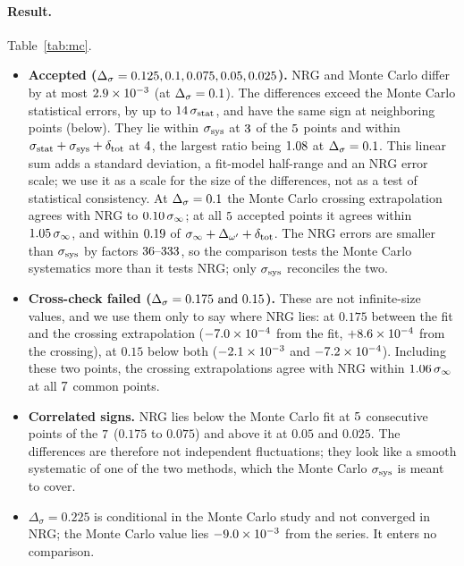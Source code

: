 \documentclass[10pt,a4paper]{article}
\newcommand{\Ds}{\Delta_\sigma}
\newcommand{\dtot}{\delta_{\rm tot}}
\begin{document}
\paragraph{Result.} Table~\ref{tab:mc}.
\begin{itemize}
\item \textbf{Accepted ($\Ds=\nrgmcAccList$).} NRG and Monte Carlo differ by at most $2.9\times10^{-3}$ (at $\Ds=\nrgmcAccDiffMaxAt$).
  The differences exceed the Monte Carlo statistical errors, by up to $14\,\sigma_{\rm stat}$, and have the same
  sign at neighboring points (below). They lie within $\sigma_{\rm sys}$ at $3$ of the $5$ points and within
  $\sigma_{\rm stat}+\sigma_{\rm sys}+\dtot$ at $4$, the largest ratio being $1.08$ at
  $\Ds=\nrgmcAccDiffMaxAt$. This linear sum adds a standard deviation, a fit-model half-range and an NRG error scale; we use it as a
  scale for the size of the differences, not as a test of statistical consistency. At $\Ds=\nrgmcAccDiffMaxAt$ the Monte Carlo
  crossing extrapolation agrees with NRG to $0.10\,\sigma_\infty$; at all $5$ accepted points it agrees
  within $1.05\,\sigma_\infty$, and within $0.19$ of $\sigma_\infty+\Delta_{\omega'}+\dtot$. The NRG
  errors are smaller than $\sigma_{\rm sys}$ by factors $36\text{--}333$, so the comparison tests the Monte Carlo systematics more
  than it tests NRG; only $\sigma_{\rm sys}$ reconciles the two.
\item \textbf{Cross-check failed ($\Ds=\nrgmcCcfList$).} These are not infinite-size values, and we use them only to say where NRG lies:
  at $0.175$ between the fit and the crossing extrapolation ($-7.0\times10^{-4}$ from the fit, $+8.6\times10^{-4}$ from
  the crossing), at $0.15$ below both ($-2.1\times10^{-3}$ and $-7.2\times10^{-4}$). Including these two points, the crossing
  extrapolations agree with NRG within $1.06\,\sigma_\infty$ at all $7$ common points.
\item \textbf{Correlated signs.} NRG lies below the Monte Carlo fit at $5$ consecutive points of the $7$
  ($0.175$ to $0.075$) and above it at $0.05$ and $0.025$. The differences are therefore not independent fluctuations; they look like
  a smooth systematic of one of the two methods, which the Monte Carlo $\sigma_{\rm sys}$ is meant to cover.
\item \textbf{$\Ds=0.225$} is conditional in the Monte Carlo study and not converged in NRG; the Monte Carlo value lies
  $-9.0\times10^{-3}$ from the series. It enters no comparison.
\end{itemize}
\end{document}
